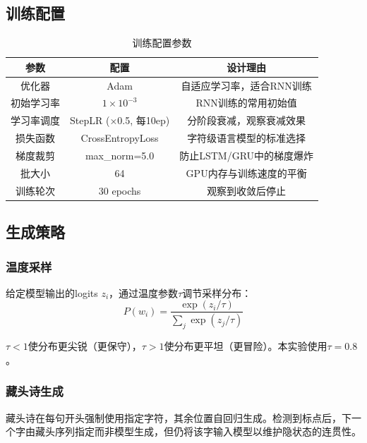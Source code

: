 \documentclass[12pt,a4paper]{article}
\begin{document}
\subsection{训练配置}

\begin{table}[H]
\centering
\caption{训练配置参数}
\begin{tabular}{ccc}
\toprule
参数 & 配置 & 设计理由 \\
\midrule
优化器 & Adam & 自适应学习率，适合RNN训练 \\
初始学习率 & $1 \times 10^{-3}$ & RNN训练的常用初始值 \\
学习率调度 & StepLR (×0.5, 每10ep) & 分阶段衰减，观察衰减效果 \\
损失函数 & CrossEntropyLoss & 字符级语言模型的标准选择 \\
梯度裁剪 & max\_norm=5.0 & 防止LSTM/GRU中的梯度爆炸 \\
批大小 & 64 & GPU内存与训练速度的平衡 \\
训练轮次 & 30 epochs & 观察到收敛后停止 \\
\bottomrule
\end{tabular}
\end{table}


\subsection{生成策略}

\subsubsection{温度采样}

给定模型输出的logits $z_i$，通过温度参数$\tau$调节采样分布：
\begin{equation}
    P(w_i) = \frac{\exp(z_i / \tau)}{\sum_j \exp(z_j / \tau)}
\end{equation}

$\tau < 1$使分布更尖锐（更保守），$\tau > 1$使分布更平坦（更冒险）。本实验使用$\tau = 0.8$。

\subsubsection{藏头诗生成}

藏头诗在每句开头强制使用指定字符，其余位置自回归生成。检测到标点后，下一个字由藏头序列指定而非模型生成，但仍将该字输入模型以维护隐状态的连贯性。
\end{document}
